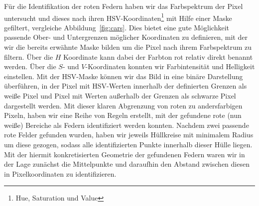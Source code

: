 \documentclass[10pt]{article}
\begin{document}
    Für die Identifikation der roten Federn haben wir das Farbspektrum der Pixel untersucht und dieses nach ihren HSV-Koordinaten\footnote{Hue, Saturation und Value} mit Hilfe einer Maske gefiltert, vergleiche Abbildung~\ref{fig:cars}.
    Dies bietet eine gute Möglichkeit passende Ober- und Untergrenzen möglicher Koordinaten zu definieren, mit der wir die bereits erwähnte Maske bilden um die Pixel nach ihrem Farbspektrum zu filtern.
    Über die $H$ Koordinate kann dabei der Farbton rot relativ direkt benannt werden.
    Über die $S$- und $V$-Koordinaten konnten wir Farbintensität und Helligkeit einstellen.
    Mit der HSV-Maske können wir das Bild in eine binäre Darstellung überführen, in der Pixel mit HSV-Werten innerhalb der definierten Grenzen als weiße Pixel und Pixel mit Werten außerhalb der Grenzen als schwarze Pixel dargestellt werden.
    Mit dieser klaren Abgrenzung von roten zu andersfarbigen Pixeln, haben wir eine Reihe von Regeln erstellt, mit der gefundene rote (nun weiße) Bereiche als Federn identifiziert werden konnten.
    Nachdem zwei passende rote Felder gefunden wurden, haben wir jeweils Hüllkreise mit minimalem Radius um diese gezogen, sodass alle identifizierten Punkte innerhalb dieser Hülle liegen.
    Mit der hiermit konkretisierten Geometrie der gefundenen Federn waren wir in der Lage zunächst die Mittelpunkte und daraufhin den Abstand zwischen diesen in Pixelkoordinaten zu identifizieren.
\end{document}
